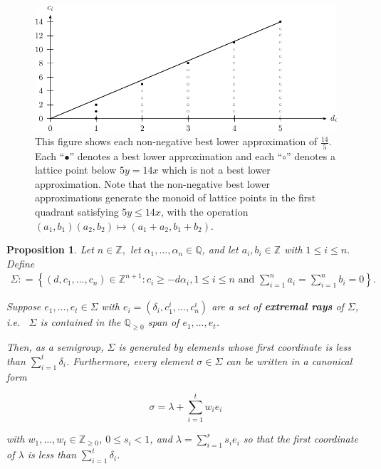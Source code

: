 \documentclass{amsart}
\theoremstyle{plain}
\newtheorem{prop}[thm]{Proposition}
\theoremstyle{definition}
\theoremstyle{remark}
\numberwithin{equation}{section}
\newcommand\bq{{\mathbb Q}}
\newcommand\bz{{\mathbb Z}}
\newcommand\pdeg{\delta}
\begin{document}
\begin{figure}
\includegraphics{pics/spin-lower-approximations-pic-pics.pdf}
\caption{This figure shows each non-negative best lower
approximation of $\frac{14}{5}.$ Each ``$\bullet$'' denotes a best
lower approximation and each ``$\circ$'' denotes a lattice point
below $5y=14x$ which is not a best lower approximation.  Note that
the non-negative best lower approximations generate the monoid of
lattice points in the first quadrant satisfying  $5y \le 14x$, with
the operation $(a_1, b_1)(a_2, b_2)\mapsto (a_1 + a_2, b_1 + b_2)$.}
\label{fig:s14/5-lattice}
\end{figure}

\begin{prop}
\label{prop:cone-generation}
Let $n \in \bz,$ let $\alpha_1, \ldots, \alpha_n \in \bq$, and let
$a_i, b_i \in \bz$ with $1 \leq i \leq n.$ Define
\begin{align*}
	\Sigma \colon = \left \{(d, c_1, \ldots, c_n) \in \bz^{n + 1} \colon c_i \geq -
	d \alpha_i, 1 \leq i \leq n \text{ and } \sum_{i = 1}^{n} a_i =
	\sum_{i	= 1}^{n}b_i = 0 \right \}.
\end{align*}

\noindent
Suppose $e_1, \ldots, e_t \in \Sigma$ with $e_i = (\pdeg_i, c_1^i,
\ldots, c_n^i)$ are a set of {\bf extremal rays} of $\Sigma$,
i.e.~ $\Sigma$ is contained in the $\bq_{\geq 0}$ span of
$e_1, \ldots, e_t$.

Then, as a semigroup, $\Sigma$ is generated by
elements whose first coordinate is less than $\sum_{i = 1}^{t}
\pdeg_i$. Furthermore, every element $\sigma \in \Sigma$ can be
written in a canonical form 

\begin{equation}
	\label{eqn:sigma-canonical-form}
	\sigma = \lambda + \sum_{i = 1}^{t} w_i e_i
\end{equation}

\noindent
with $w_1, \ldots, w_t \in \bz_{\geq 0}$,
$0 \leq s_i < 1$, and $\lambda = \sum_{i = 1}^{r} s_i e_i$ 
so that the
first coordinate of $\lambda$ is less than $\sum_{i=1}^{t}\pdeg_i$.
\end{prop}
\end{document}
